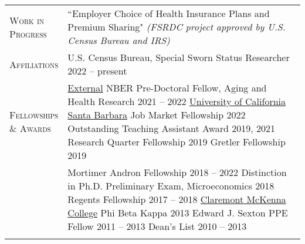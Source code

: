 \documentclass[11pt]{article}
\begin{document}
\begin{tabularx}{\textwidth}{@{}Y Z@{}}
    \textsc{Work in \newline Progress}  & 
    ``Employer Choice of Health Insurance Plans and Premium Sharing" \newline
    \textit{(FSRDC project approved by U.S. Census Bureau and IRS)} 
     \\ \addlinespace[20pt]

	\textsc{Affiliations}  & 
	U.S. Census Bureau, Special Sworn Status Researcher \hfill 2022 -- present%
	\\ \addlinespace[20pt]

	\textsc{Fellowships \newline \& Awards} & 
	\uline{External}
	\vspace{3pt} \newline
	NBER Pre-Doctoral Fellow, Aging and Health Research \hfill 2021 -- 2022%
	\vspace{10pt} \newline
	\uline{University of California Santa Barbara}
	\vspace{3pt} \newline
	Job Market Fellowship \hfill 2022%
	\vspace{3pt} \newline
	Outstanding Teaching Assistant Award \hfill 2019, 2021%
	\vspace{3pt} \newline
	Research Quarter Fellowship \hfill 2019%
	\vspace{3pt} \newline
	Gretler Fellowship \hfill 2019%
	\\ \newpage 
	&
	Mortimer Andron Fellowship \hfill 2018 -- 2022%
	\vspace{3pt} \newline 
	Distinction in Ph.D. Preliminary Exam, Microeconomics \hfill 2018%
	\vspace{3pt} \newline
	Regents Fellowship \hfill 2017 -- 2018%
	\vspace{10pt} \newline
	\uline{Claremont McKenna College}
	\vspace{3pt} \newline
	Phi Beta Kappa \hfill 2013%
	\vspace{3pt} \newline
	Edward J. Sexton PPE Fellow \hfill 2011 -- 2013%
	\vspace{3pt} \newline
	Dean's List \hfill 2010 -- 2013%
	 \\ \addlinespace[20pt] 
	


\end{tabularx}
\end{document}
